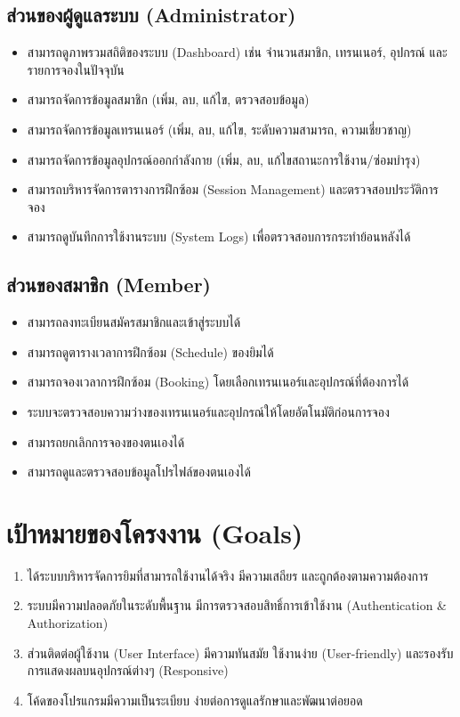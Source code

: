 \subsection{ส่วนของผู้ดูแลระบบ (Administrator)}
\begin{itemize}
    \item สามารถดูภาพรวมสถิติของระบบ (Dashboard) เช่น จำนวนสมาชิก, เทรนเนอร์, อุปกรณ์ และรายการจองในปัจจุบัน
    \item สามารถจัดการข้อมูลสมาชิก (เพิ่ม, ลบ, แก้ไข, ตรวจสอบข้อมูล)
    \item สามารถจัดการข้อมูลเทรนเนอร์ (เพิ่ม, ลบ, แก้ไข, ระดับความสามารถ, ความเชี่ยวชาญ)
    \item สามารถจัดการข้อมูลอุปกรณ์ออกกำลังกาย (เพิ่ม, ลบ, แก้ไขสถานะการใช้งาน/ซ่อมบำรุง)
    \item สามารถบริหารจัดการตารางการฝึกซ้อม (Session Management) และตรวจสอบประวัติการจอง
    \item สามารถดูบันทึกการใช้งานระบบ (System Logs) เพื่อตรวจสอบการกระทำย้อนหลังได้
\end{itemize}

\subsection{ส่วนของสมาชิก (Member)}
\begin{itemize}
    \item สามารถลงทะเบียนสมัครสมาชิกและเข้าสู่ระบบได้
    \item สามารถดูตารางเวลาการฝึกซ้อม (Schedule) ของยิมได้
    \item สามารถจองเวลาการฝึกซ้อม (Booking) โดยเลือกเทรนเนอร์และอุปกรณ์ที่ต้องการได้
    \item ระบบจะตรวจสอบความว่างของเทรนเนอร์และอุปกรณ์ให้โดยอัตโนมัติก่อนการจอง
    \item สามารถยกเลิกการจองของตนเองได้
    \item สามารถดูและตรวจสอบข้อมูลโปรไฟล์ของตนเองได้
\end{itemize}

\section{เป้าหมายของโครงงาน (Goals)}
\begin{enumerate}
    \item ได้ระบบบริหารจัดการยิมที่สามารถใช้งานได้จริง มีความเสถียร และถูกต้องตามความต้องการ
    \item ระบบมีความปลอดภัยในระดับพื้นฐาน มีการตรวจสอบสิทธิ์การเข้าใช้งาน (Authentication \& Authorization)
    \item ส่วนติดต่อผู้ใช้งาน (User Interface) มีความทันสมัย ใช้งานง่าย (User-friendly) และรองรับการแสดงผลบนอุปกรณ์ต่างๆ (Responsive)
    \item โค้ดของโปรแกรมมีความเป็นระเบียบ ง่ายต่อการดูแลรักษาและพัฒนาต่อยอด
\end{enumerate}


